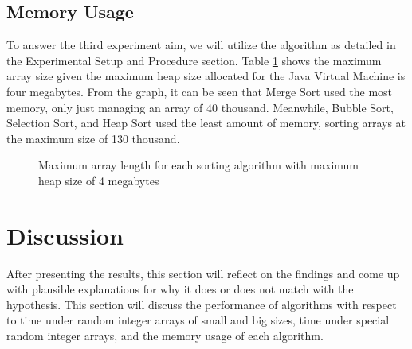 \documentclass{report}
\begin{document}
\subsection{Memory Usage}
To answer the third experiment aim, we will utilize the algorithm as detailed in the Experimental Setup and Procedure section. Table \ref{memArr} shows the maximum array size given the maximum heap size allocated for the Java Virtual Machine is four megabytes. From the graph, it can be seen that Merge Sort used the most memory, only just managing an array of 40 thousand. Meanwhile, Bubble Sort, Selection Sort, and Heap Sort used the least amount of memory, sorting arrays at the maximum size of 130 thousand.

\begin{figure}
	\centering
	\caption{Maximum array length for each sorting algorithm with maximum heap size of 4 megabytes}
	\label{memArr}
\end{figure}

\section{Discussion}
After presenting the results, this section will reflect on the findings and come up with plausible explanations for why it does or does not match with the hypothesis. This section will discuss the performance of algorithms with respect to time under random integer arrays of small and big sizes, time under special random integer arrays, and the memory usage of each algorithm.
\end{document}
